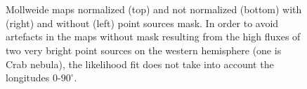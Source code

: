 \documentclass[a4paper]{article}
\begin{document}
\begin{figure}[h]
{\begin{subfigure}[b]{.5\textwidth}
	\end{subfigure}%
	}\\
	\\
\caption{Mollweide maps normalized (top) and not normalized (bottom) with (right) and without (left) point sources mask. In order to avoid artefacts in the maps without mask resulting from the high fluxes of two very bright point sources on the western hemisphere (one is Crab nebula), the likelihood fit does not take into account the longitudes 0-$90^\circ$.}
\label{Fit_IC_pi0_to_ROI}
\end{figure}
\end{document}
